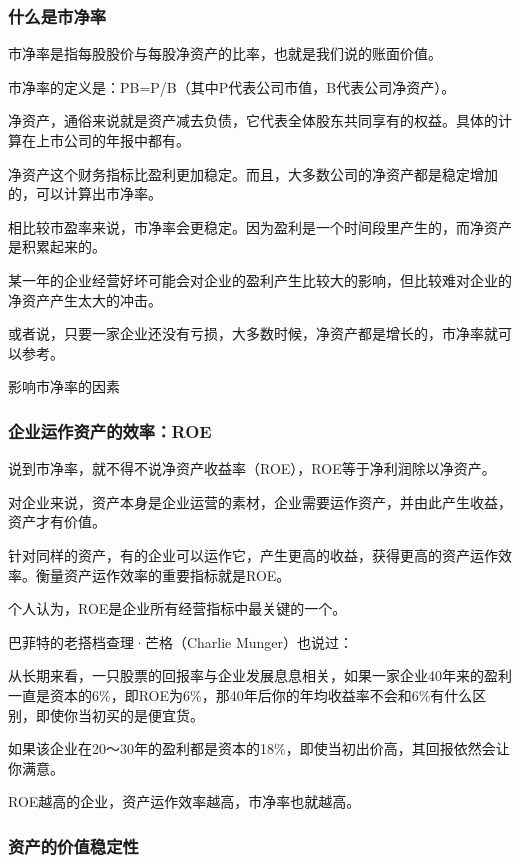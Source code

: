\subsubsection{什么是市净率}

市净率是指每股股价与每股净资产的比率，也就是我们说的账面价值。

市净率的定义是：PB=P/B（其中P代表公司市值，B代表公司净资产）。

净资产，通俗来说就是资产减去负债，它代表全体股东共同享有的权益。具体的计算在上市公司的年报中都有。

净资产这个财务指标比盈利更加稳定。而且，大多数公司的净资产都是稳定增加的，可以计算出市净率。

相比较市盈率来说，市净率会更稳定。因为盈利是一个时间段里产生的，而净资产是积累起来的。

某一年的企业经营好坏可能会对企业的盈利产生比较大的影响，但比较难对企业的净资产产生太大的冲击。

或者说，只要一家企业还没有亏损，大多数时候，净资产都是增长的，市净率就可以参考。

{\fangsong 影响市净率的因素}

\subsubsection{企业运作资产的效率：ROE}

说到市净率，就不得不说净资产收益率（ROE），ROE等于净利润除以净资产。

对企业来说，资产本身是企业运营的素材，企业需要运作资产，并由此产生收益，资产才有价值。

针对同样的资产，有的企业可以运作它，产生更高的收益，获得更高的资产运作效率。衡量资产运作效率的重要指标就是ROE。

个人认为，ROE是企业所有经营指标中最关键的一个。

巴菲特的老搭档查理·芒格（Charlie Munger）也说过：

{\kaishu 从长期来看，一只股票的回报率与企业发展息息相关，如果一家企业40年来的盈利一直是资本的6\%，即ROE为6\%，那40年后你的年均收益率不会和6\%有什么区别，即使你当初买的是便宜货。}

{\kaishu 如果该企业在20～30年的盈利都是资本的18\%，即使当初出价高，其回报依然会让你满意。}

ROE越高的企业，资产运作效率越高，市净率也就越高。

\subsubsection{资产的价值稳定性}

